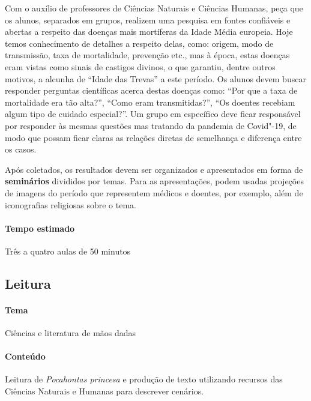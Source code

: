 \documentclass[12pt]{extarticle}
\begin{document}
 		Com o auxílio de professores de Ciências Naturais e Ciências Humanas,
 		peça que os alunos, separados em grupos, realizem uma pesquisa em fontes confiáveis
 		e abertas a respeito das doenças mais mortíferas da Idade Média europeia. 
 		Hoje temos conhecimento de detalhes a respeito delas, como: origem, modo
 		de transmissão, taxa de mortalidade, prevenção etc., mas à época, estas
 		doenças eram vistas como sinais de castigos divinos, o que garantiu, dentre outros
 		motivos, a alcunha de ``Idade das Trevas'' a este período. Os alunos devem 
 		buscar responder perguntas científicas acerca destas doenças como: ``Por que
 		a taxa de mortalidade era tão alta?'', ``Como eram transmitidas?'', ``Os doentes
 		recebiam algum tipo de cuidado especial?''. Um grupo em específico deve
 		ficar responsável por responder às mesmas questões mas tratando da pandemia
 		de Covid"-19, de modo que possam ficar claras as relações diretas de semelhança
 		e diferença entre os casos.
 	
 		Após coletados, os resultados devem ser organizados e apresentados em forma 
 		de \textbf{seminários} divididos por temas. Para as apresentações, podem usadas
 		projeções de imagens do período que representem médicos e doentes, por exemplo,
 		além de iconografias religiosas sobre o tema.
 	
 \paragraph{Tempo estimado} Três a quatro aulas de 50 minutos


\subsection{Leitura}

 \paragraph{Tema} Ciências e literatura de mãos dadas

 \paragraph{Conteúdo} Leitura de \emph{Pocahontas princesa} e produção de texto
 utilizando recursos das Ciências Naturais e Humanas para descrever cenários.
\end{document}
